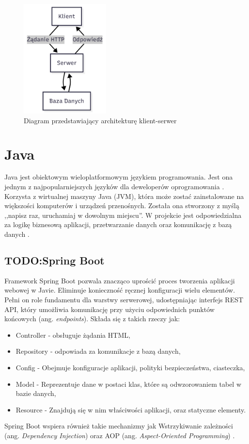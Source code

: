 \begin{figure}[H]
	\centering
	\includegraphics[width=0.4\textwidth]{images/Klient-Serwer.png}
	\caption{Diagram przedstawiający architekturę klient-serwer}
	\label{fig:KlientSerwer}
\end{figure}
\section{Java}
Java jest obiektowym wieloplatformowym językiem programowania. Jest ona jednym z najpopularniejszych języków dla deweloperów oprogramowania \cite{JavaMicrosoft}. Korzysta z wirtualnej maszyny Java (JVM), która może zostać zainstalowane na większości komputerów i urządzeń przenośnych. Została ona stworzony z myślą ,,napisz raz, uruchamiaj w dowolnym miejscu''. 
W projekcie jest odpowiedzialna za logikę biznesową aplikacji, przetwarzanie danych oraz komunikację z bazą danych \cite{JDK21Docs}.
\subsection*{TODO:Spring Boot}
Framework Spring Boot pozwala znacząco uprościć proces tworzenia aplikacji webowej w Javie. Eliminuje konieczność ręcznej konfiguracji wielu elementów. Pełni on role fundamentu dla warstwy serwerowej, udostępniając interfejs REST API, który umożliwia komunikację przy użyciu odpowiednich punktów końcowych (ang. \textit{endpoints}). Składa się z takich rzeczy jak:
\begin{itemize}
	\item Controller - obsługuje żądania HTML,
	\item Repository - odpowiada za komunikacje z bazą danych,
	\item Config - Obejmuje konfiguracje aplikacji, polityki bezpieczeństwa, ciasteczka,
	\item Model - Reprezentuje dane w postaci klas, które są odwzorowaniem tabel w bazie danych,
	\item Resource - Znajdują się w nim właściwości aplikacji, oraz statyczne elementy.
\end{itemize}
Spring Boot wspiera również takie mechanizmy jak Wstrzykiwanie zależności (ang. \textit{Dependency Injection}) oraz AOP (ang. \textit{Aspect-Oriented Programming}) \cite{SpringDocs}.

